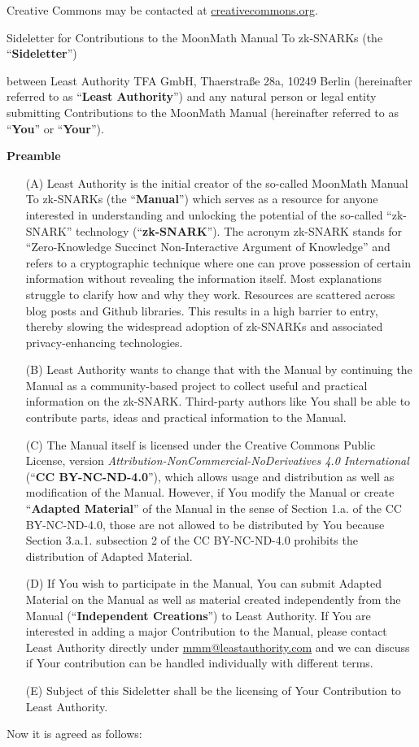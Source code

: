 Creative Commons may be contacted at \href{creativecommons.org}{creativecommons.org}.

\begin{center}\Large 
Sideletter for Contributions to the MoonMath Manual To zk-SNARKs (the ``\textbf{Sideletter}'')
\end{center}

between Least Authority TFA GmbH, Thaerstraße 28a, 10249 Berlin (hereinafter referred to as ``\textbf{Least Authority}'') and any natural person or legal entity submitting Contributions to the MoonMath Manual (hereinafter referred to as ``\textbf{You}'' or ``\textbf{Your}''). 
\begin{center}\bfseries
Preamble
\end{center}
\begin{itemize}
\item[(A)] Least Authority is the initial creator of the so-called MoonMath Manual To zk-SNARKs (the ``\textbf{Manual}'') which serves as a resource for anyone interested in understanding and unlocking the potential of the so-called ``zk-SNARK'' technology (``\textbf{zk-SNARK}''). The acronym zk-SNARK stands for “Zero-Knowledge Succinct Non-Interactive Argument of Knowledge” and refers to a cryptographic technique where one can prove possession of certain information without revealing the information itself. Most explanations struggle to clarify how and why they work. Resources are scattered across blog posts and Github libraries. This results in a high barrier to entry, thereby slowing the widespread adoption of zk-SNARKs and associated privacy-enhancing technologies. 
\item[(B)] Least Authority wants to change that with the Manual by continuing the Manual as a community-based project to collect useful and practical information on the zk-SNARK. Third-party authors like You shall be able to contribute parts, ideas and practical information to the Manual. 
\item[(C)] The Manual itself is licensed under the Creative Commons Public License, version \textsl{Attri\-bution-NonCommercial-NoDerivatives 4.0 International} (``\textbf{CC BY-NC-ND-4.0}''), which allows usage and distribution as well as modification of the Manual. However, if You modify the Manual or create ``\textbf{Adapted Material}'' of the Manual in the sense of Section 1.a. of the CC BY-NC-ND-4.0, those are not allowed to be distributed by You because Section 3.a.1. subsection 2 of the CC BY-NC-ND-4.0 prohibits the distribution of Adapted Material. 
\item[(D)] If You wish to participate in the Manual, You can submit Adapted Material on the Manual as well as material created independently from the Manual (``\textbf{Independent Creations}'') to Least Authority. If You are interested in adding a major Contribution to the Manual, please contact Least Authority directly under \href{mailto:mmm@leastauthority.com}{mmm@leastauthority.com} and we can discuss if Your contribution can be handled individually with different terms.
\item[(E)] Subject of this Sideletter shall be the licensing of Your Contribution to Least Authority. 
\end{itemize}
Now it is agreed as follows:

